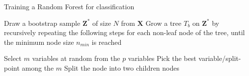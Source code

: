 \begin{algorithm}[H]
  \label{alg:rf}
 \caption{Training a Random Forest for classification}
 \begin{algorithmic}[1]
        \State Draw a bootstrap sample $\bm{Z}^{*}$ of size $N$ from $\bm{X}$
        \State Grow a tree $T_{b}$ on $\bm{Z}^{*}$ by recursively repeating the following steps for each non-leaf node of the tree, until the minimum node size $n_{min}$ is reached
        \begin{algsubstates}
                \State Select $m$ variables at random from the $p$ variables
                \State Pick the best variable/split-point among the $m$
                \State Split the node into two children nodes
            \end{algsubstates}
    \EndFor
  \end{algorithmic}
\end{algorithm}


\endinput

